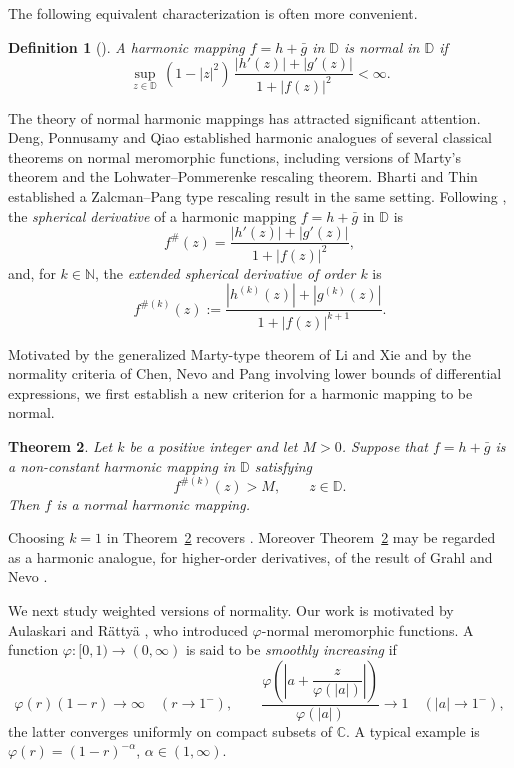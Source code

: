 \documentclass[10pt,a4paper]{amsart}
\newtheorem{theorem}{Theorem}[section]
\newtheorem{definition}[theorem]{Definition}
\newcommand{\D}{\mathbb{D}}
\newcommand{\C}{\mathbb{C}}
\newcommand{\N}{\mathbb{N}}
\begin{document}
The following equivalent characterization is often more convenient.

\begin{definition}[{\cite[Proposition~2.1]{AHS}}]\label{def:normalharmeq}
A harmonic mapping $f=h+\bar g$ in $\D$ is \emph{normal} in $\D$ if
\begin{equation}\label{eq:normalharmeq}
\sup_{z\in\D}\,(1-|z|^{2})\,\frac{|h'(z)|+|g'(z)|}{1+|f(z)|^{2}}<\infty.
\end{equation}
\end{definition}

The theory of normal harmonic mappings has attracted significant attention. Deng,
Ponnusamy and Qiao \cite{DPQ} established harmonic analogues of several classical theorems
on normal meromorphic functions, including versions of Marty's theorem and the
Lohwater--Pommerenke rescaling theorem. Bharti and Thin \cite{BT} established a
Zalcman--Pang type rescaling result in the same setting. Following \cite{BT}, the
\emph{spherical derivative} of a harmonic mapping $f=h+\bar g$ in $\D$ is
\[
f^{\#}(z)=\frac{|h'(z)|+|g'(z)|}{1+|f(z)|^{2}},
\]
and, for $k\in\N$, the \emph{extended spherical derivative of order $k$} is
\begin{equation}\label{eq:extsph}
f^{\#(k)}(z):=\frac{|h^{(k)}(z)|+|g^{(k)}(z)|}{1+|f(z)|^{k+1}}.
\end{equation}

Motivated by the generalized Marty-type theorem of Li and Xie \cite{LiXie} and by the
normality criteria of Chen, Nevo and Pang \cite{CNP} involving lower bounds of differential
expressions, we first establish a new criterion for a harmonic mapping to be normal.

\begin{theorem}\label{thm:lowerbound}
Let $k$ be a positive integer and let $M>0$. Suppose that $f=h+\bar g$ is a non-constant
harmonic mapping in $\D$ satisfying
\begin{equation}\label{eq:lowerbound}
f^{\#(k)}(z)>M,\qquad z\in\D.
\end{equation}
Then $f$ is a normal harmonic mapping.
\end{theorem}

Choosing $k=1$ in Theorem~\ref{thm:lowerbound} recovers \cite[Theorem~1.4]{BT}. Moreover
Theorem~\ref{thm:lowerbound} may be regarded as a harmonic analogue, for higher-order
derivatives, of the result of Grahl and Nevo \cite{GrahlNevo}.

We next study weighted versions of normality. Our work is motivated by Aulaskari and
R\"atty\"a \cite{AR}, who introduced $\varphi$-normal meromorphic functions. A function
$\varphi\colon[0,1)\to(0,\infty)$ is said to be \emph{smoothly increasing} if
\[
\varphi(r)(1-r)\longrightarrow\infty\quad(r\to1^{-}),\qquad
\frac{\varphi\!\left(\left|a+\dfrac{z}{\varphi(|a|)}\right|\right)}{\varphi(|a|)}\longrightarrow 1
\quad(|a|\to1^{-}),
\]
the latter converges uniformly on compact subsets of $\C$. A typical example is
$\varphi(r)=(1-r)^{-\alpha}$, $\alpha\in(1,\infty)$.
\end{document}
